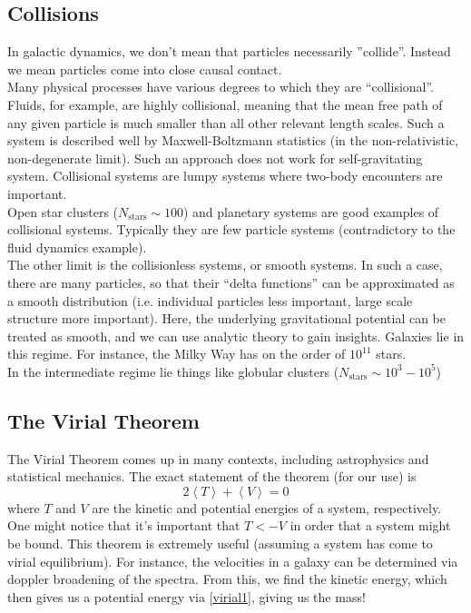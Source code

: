 \documentclass[10pt]{article}
\newcommand{\n}{\noindent}
\newcommand{\avg}[1]{\left<#1\right>}
\begin{document}
	\subsection{Collisions}
	In galactic dynamics, we don't mean that particles necessarily ''collide''. Instead we mean particles come into close causal contact.\\
	
	\n Many physical processes have various degrees to which they are ``collisional''. Fluids, for example, are highly collisional, meaning that the mean free path of any given particle is much smaller than all other relevant length scales. Such a system is described well by Maxwell-Boltzmann statistics (in the non-relativistic, non-degenerate limit). Such an approach does not work for self-gravitating system. Collisional systems are lumpy systems where two-body encounters are important.\\
	
	\n Open star clusters ($N_{\mathrm{stars}}\sim 100$) and planetary systems are good examples of collisional systems. Typically they are few particle systems (contradictory to the fluid dynamics example).\\
	
	\n The other limit is the collisionless systems, or smooth systems. In such a case, there are many particles, so that their ``delta functions'' can be approximated as a smooth distribution (i.e. individual particles less important, large scale structure more important). Here, the underlying gravitational potential can be treated as smooth, and we can use analytic theory to gain insights. Galaxies lie in this regime. For instance, the Milky Way has on the order of $10^11$ stars.\\
	
	\n In the intermediate regime lie things like globular clusters ($N_{\mathrm{stars}}\sim 10^3-10^5$)
	
	\subsection{The Virial Theorem}
	The Virial Theorem comes up in many contexts, including astrophysics and statistical mechanics. The exact statement of the theorem (for our use) is 
	\begin{equation} \label {virial1} 2\avg{T} + \avg{V} = 0\end{equation}
	where $T$ and $V$ are the kinetic and potential energies of a system, respectively. One might notice that it's important that $T<-V$ in order that a system might be bound. This theorem is extremely useful (assuming a system has come to virial equilibrium). For instance, the velocities in a galaxy can be determined via doppler broadening of the spectra. From this, we find the kinetic energy, which then gives us a potential energy via \eqref{virial1}, giving us the mass!\\
	
\end{document}
